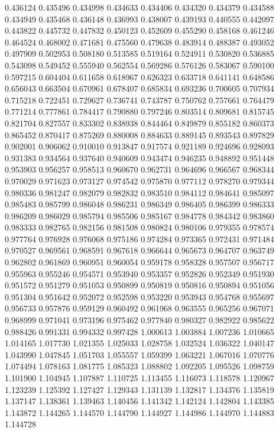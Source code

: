 0.436124
0.435496
0.434998
0.434633
0.434406
0.434320
0.434379
0.434588
0.434949
0.435468
0.436148
0.436993
0.438007
0.439193
0.440555
0.442097
0.443822
0.445732
0.447832
0.450123
0.452609
0.455290
0.458168
0.461246
0.464524
0.468002
0.471681
0.475560
0.479638
0.483914
0.488387
0.493052
0.497909
0.502953
0.508180
0.513585
0.519164
0.524911
0.530820
0.536885
0.543098
0.549452
0.555940
0.562554
0.569286
0.576126
0.583067
0.590100
0.597215
0.604404
0.611658
0.618967
0.626323
0.633718
0.641141
0.648586
0.656043
0.663504
0.670961
0.678407
0.685834
0.693236
0.700605
0.707934
0.715218
0.722451
0.729627
0.736741
0.743787
0.750762
0.757661
0.764479
0.771214
0.777861
0.784417
0.790880
0.797246
0.803514
0.809681
0.815745
0.821704
0.827557
0.833302
0.838938
0.844464
0.849879
0.855182
0.860373
0.865452
0.870417
0.875269
0.880008
0.884633
0.889145
0.893543
0.897829
0.902001
0.906062
0.910010
0.913847
0.917574
0.921189
0.924696
0.928093
0.931383
0.934564
0.937640
0.940609
0.943474
0.946235
0.948892
0.951448
0.953903
0.956257
0.958513
0.960670
0.962731
0.964696
0.966567
0.968344
0.970029
0.971623
0.973127
0.974542
0.975870
0.977112
0.978270
0.979344
0.980336
0.981247
0.982079
0.982832
0.983510
0.984112
0.984641
0.985097
0.985483
0.985799
0.986048
0.986231
0.986349
0.986405
0.986399
0.986333
0.986209
0.986029
0.985794
0.985506
0.985167
0.984778
0.984342
0.983860
0.983333
0.982765
0.982156
0.981508
0.980824
0.980106
0.979355
0.978574
0.977764
0.976928
0.976068
0.975186
0.974284
0.973365
0.972431
0.971484
0.970527
0.969561
0.968591
0.967618
0.966644
0.965673
0.964707
0.963749
0.962802
0.961869
0.960951
0.960054
0.959178
0.958328
0.957507
0.956717
0.955963
0.955246
0.954571
0.953940
0.953357
0.952826
0.952349
0.951930
0.951572
0.951279
0.951053
0.950899
0.950819
0.950816
0.950894
0.951056
0.951304
0.951642
0.952072
0.952598
0.953220
0.953943
0.954768
0.955697
0.956733
0.957876
0.959129
0.960492
0.961968
0.963555
0.965256
0.967071
0.968999
0.971041
0.973196
0.975462
0.977840
0.980327
0.982922
0.985622
0.988426
0.991331
0.994332
0.997428
1.000613
1.003884
1.007236
1.010665
1.014165
1.017730
1.021355
1.025033
1.028758
1.032524
1.036322
1.040147
1.043990
1.047845
1.051703
1.055557
1.059399
1.063221
1.067016
1.070776
1.074494
1.078163
1.081775
1.085323
1.088802
1.092205
1.095526
1.098759
1.101900
1.104945
1.107887
1.110725
1.113455
1.116073
1.118578
1.120967
1.123239
1.125392
1.127427
1.129343
1.131139
1.132817
1.134376
1.135819
1.137147
1.138361
1.139463
1.140456
1.141342
1.142124
1.142804
1.143385
1.143872
1.144265
1.144570
1.144790
1.144927
1.144986
1.144970
1.144883
1.144728
